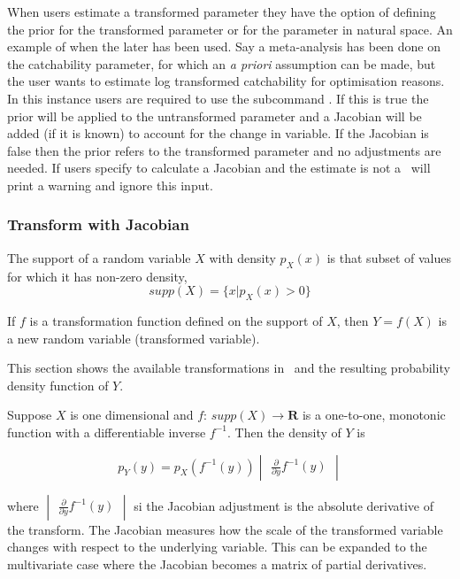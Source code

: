 When users estimate a transformed parameter they have the option of defining the prior for the transformed parameter or for the parameter in natural space. An example of when the later has been used. Say a meta-analysis has been done on the catchability parameter, for which an \textit{a priori} assumption can be made, but the user wants to estimate log transformed catchability for optimisation reasons. In this instance users are required to use the subcommand . If this is true the prior will be applied to the untransformed parameter and a Jacobian will be added (if it is known) to account for the change in variable. If the Jacobian is false then the prior refers to the transformed parameter and no adjustments are needed. If users specify to calculate a Jacobian and the estimate is not a  \CNAME\ will print a warning and ignore this input.

\subsubsection{Transform with Jacobian}
The support of a random variable $X$ with density $p_X(x)$ is that subset of values for which it has non-zero density,
\begin{equation}
  supp(X) = \{x|p_X(x) > 0\}
\end{equation}

If $f$ is a transformation function defined on the support of $X$, then $Y = f(X)$ is a new random variable (transformed variable).

This section shows the available transformations in \CNAME\ and the resulting probability density function of $Y$. %

Suppose $X$ is one dimensional and $f$: $supp(X) \to \mathbf{R}$ is a one-to-one, monotonic function with a differentiable inverse $f^{-1}$. Then the density of $Y$ is

\begin{equation}\label{eq:jacobian}
	p_Y(y) = p_X(f^{-1}(y)) \begin{vmatrix} \frac{\partial}{\partial y} f^{-1}(y) \end{vmatrix}
\end{equation}

where $\begin{vmatrix} \frac{\partial}{\partial y} f^{-1}(y) \end{vmatrix}$ si the Jacobian adjustment is the absolute derivative of the transform. The Jacobian measures how the scale of the transformed variable changes with respect to the underlying variable. This can be expanded to the multivariate case where the Jacobian becomes a matrix of partial derivatives.

